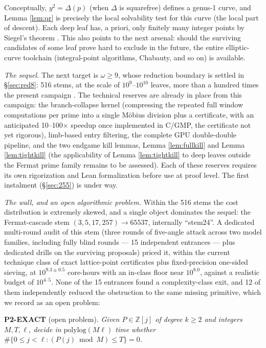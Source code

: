 \documentclass[11pt]{article}
\theoremstyle{remark}
\begin{document}
Conceptually, $y^2 = \Delta(p)$ (when $\Delta$ is squarefree) defines a genus-1 curve, and Lemma \ref{lem:qr} is precisely the local solvability test for this curve (the local part of descent). Each deep leaf has, a priori, only finitely many integer points by Siegel's theorem \cite{siegel}. This also points to the next arsenal: should the surviving candidates of some leaf prove hard to exclude in the future, the entire elliptic-curve toolchain (integral-point algorithms, Chabauty, and so on) is available.

\emph{The sequel.} The next target is $\omega \ge 9$, whose reduction boundary is settled in \S\ref{sec:red8}: 516 stems, at the scale of $10^9$--$10^{10}$ leaves, more than a hundred times the present campaign \cite{sequel}. The technical reserves are already in place from this campaign: the branch-collapse kernel (compressing the repeated full window computations per prime into a single M\"obius division plus a certificate, with an anticipated 10--100$\times$ speedup once implemented in C/GMP, the certificate not yet rigorous), limb-based entry filtering, the complete GPU double-double pipeline, and the two endgame kill lemmas, Lemma \ref{lem:fullkill} and Lemma \ref{lem:tightkill} (the applicability of Lemma \ref{lem:tightkill} to deep leaves outside the Fermat prime family remains to be assessed). Each of these reserves requires its own rigorization and Lean formalization before use at proof level. The first instalment (\S\ref{sec:255}) is under way.

\emph{The wall, and an open algorithmic problem.} Within the 516 stems the cost distribution is extremely skewed, and a single object dominates the sequel: the Fermat-cascade stem $(3,5,17,257) \to 65537$, internally ``stem24''. A dedicated multi-round audit of this stem (three rounds of five-angle attack across two model families, including fully blind rounds --- 15 independent entrances --- plus dedicated drills on the surviving proposals) priced it, within the current technique class of exact lattice-point certificates plus fixed-precision one-sided sieving, at $10^{9.3 \pm 0.5}$ core-hours with an in-class floor near $10^{8.0}$, against a realistic budget of $10^{4\text{--}5}$. None of the 15 entrances found a complexity-class exit, and 12 of them independently reduced the obstruction to the same missing primitive, which we record as an open problem:

\smallskip
\noindent\textbf{P2-EXACT} (open problem). \emph{Given $P \in \mathbb{Z}[j]$ of degree $k \ge 2$ and integers $M, T, \ell$, decide in $\mathrm{polylog}(M\ell)$ time whether $\#\{0 \le j < \ell : (P(j) \bmod M) \le T\} = 0$.}
\smallskip
\end{document}
